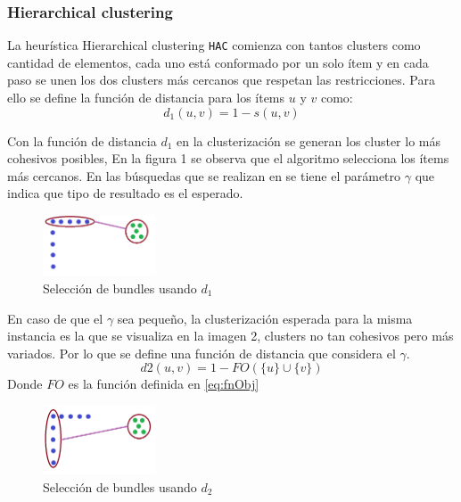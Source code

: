 \subsubsection{Hierarchical clustering}
La heurística Hierarchical clustering \texttt{HAC} comienza con tantos clusters como cantidad de elementos, cada uno está conformado por un solo ítem y en cada paso se unen los dos clusters más cercanos que respetan las restricciones. Para ello se define la función de distancia para los ítems $u$ y $v$ como:\\

\begin{equation}
d_{1}(u,v) = 1 - s(u, v)
\end{equation}

Con la función de distancia $d_{1}$ en la clusterización se generan los cluster lo más cohesivos posibles, En la figura 1 se observa que el algoritmo selecciona los ítems más cercanos. En las búsquedas que se realizan en \cite{compositeRetrival} se tiene el parámetro $\gamma$ que indica que tipo de resultado es el esperado.

\begin{figure}[H]
  \centering
    \includegraphics[width=0.3\textwidth]{img/cluster2.png}
  \caption{Selección de bundles usando $d_{1}$}
  \label{res:img-usingEfficientHAC}
\end{figure}

En caso de que el $\gamma$ sea pequeño, la clusterización esperada para la misma instancia es la que se visualiza en la imagen 2, clusters no tan cohesivos pero más variados. Por lo que se define una función de distancia que considera el $\gamma$.\\

\begin{equation}
d2(u,v) = 1 - FO(\{u\} \cup \{v\})
\end{equation}
Donde $FO$ es la función definida en \eqref{eq:fnObj} \\

\begin{figure}[H]
  \centering
    \includegraphics[width=0.3\textwidth]{img/cluster1.png}
  \caption{Selección de bundles usando $d_{2}$}
  \label{res:img-usingSingleHAC}
\end{figure}

